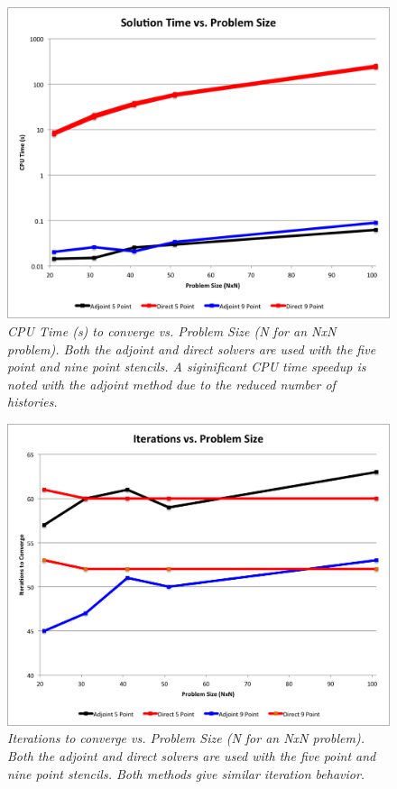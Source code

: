 \documentclass[note]{TechNote}
\begin{document}
\begin{figure}[htpb!]
  \centering
  \includegraphics[width=5in]{AdjointDirectCPUTime.png}
  \caption{\sl CPU Time (s) to converge vs. Problem Size (N for an NxN
    problem). Both the adjoint and direct solvers are used with the
    five point and nine point stencils. A siginificant CPU time
    speedup is noted with the adjoint method due to the reduced number
    of histories.}
  \label{fig:cpu_time}
\end{figure}

\begin{figure}[htbp!]
  \centering
  \includegraphics[width=5in]{AdjointDirectIterations.png}
  \caption{\sl Iterations to converge vs. Problem Size (N for an NxN
    problem). Both the adjoint and direct solvers are used with the
    five point and nine point stencils. Both methods give similar
    iteration behavior.}
  \label{fig:iterations}
\end{figure}
\end{document}
